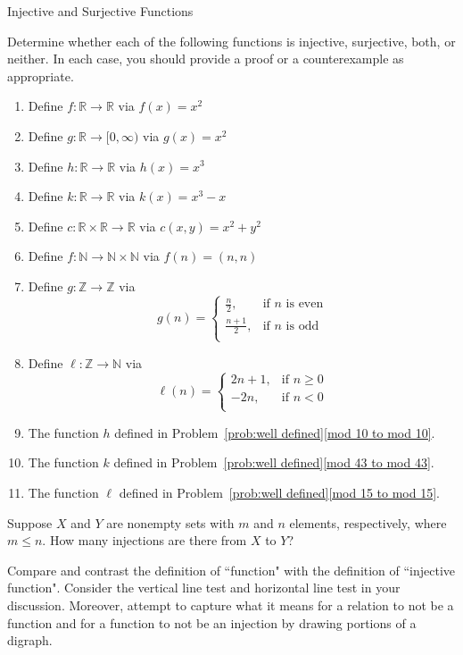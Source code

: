 \begin{section}{Injective and Surjective Functions}
\begin{problem}\label{prob:injective surjective functions}
Determine whether each of the following functions is injective, surjective, both, or neither.  In each case, you should provide a proof or a counterexample as appropriate.
\begin{enumerate}[label=\textrm{(\alph*)}]
\item Define $f:\mathbb{R}\to \mathbb{R}$ via $f(x)=x^{2}$
\item Define $g:\mathbb{R}\to [0,\infty)$ via $g(x)=x^{2}$
\item Define $h:\mathbb{R}\to \mathbb{R}$ via $h(x)=x^{3}$
\item Define $k:\mathbb{R}\to \mathbb{R}$ via $k(x)=x^{3}-x$
\item\label{circles} Define $c: \mathbb{R}\times \mathbb{R}\to \mathbb{R}$ via $c(x,y)=x^{2}+y^{2}$
\item Define $f:\mathbb{N}\to \mathbb{N}\times \mathbb{N}$ via $f(n)=(n,n)$
\item Define $g:\mathbb{Z}\to \mathbb{Z}$ via
\[
g(n)=\begin{cases}
\frac{n}{2}, & \text{if }n\text{ is even}\\
\frac{n+1}{2}, & \text{if }n\text{ is odd}\\
\end{cases}
\]
\item Define $\ell:\mathbb{Z}\to \mathbb{N}$ via
\[
\ell(n)=\begin{cases}
2n+1, & \text{if }n\geq 0\\
-2n, & \text{if }n<0\\
\end{cases}
\]
\item The function $h$ defined in Problem~\ref{prob:well defined}\ref{mod 10 to mod 10}.
\item The function $k$ defined in Problem~\ref{prob:well defined}\ref{mod 43 to mod 43}.
\item The function $\ell$ defined in Problem~\ref{prob:well defined}\ref{mod 15 to mod 15}.
\end{enumerate}
\end{problem}

\begin{problem}
Suppose $X$ and $Y$ are nonempty sets with $m$ and $n$ elements, respectively, where $m\leq  n$. How many injections are there from $X$ to $Y$?
\end{problem}

\begin{problem}
Compare and contrast the definition of ``function" with the definition of ``injective function". Consider the vertical line test and horizontal line test in your discussion.  Moreover, attempt to capture what it means for a relation to not be a function and for a function to not be an injection by drawing portions of a digraph.
\end{problem}


\end{section}
